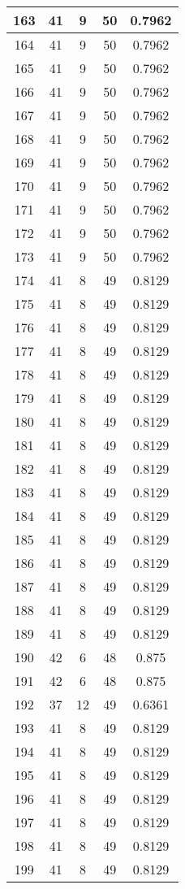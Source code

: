 \documentclass[letterpaper, 12pt]{article}
\begin{document}
\begin{longtable}{|c|c|c|c|c|}
\hline
163 & 41 & 9 & 50 & 0.7962 \\
\hline
164 & 41 & 9 & 50 & 0.7962 \\
\hline
165 & 41 & 9 & 50 & 0.7962 \\
\hline
166 & 41 & 9 & 50 & 0.7962 \\
\hline
167 & 41 & 9 & 50 & 0.7962 \\
\hline
168 & 41 & 9 & 50 & 0.7962 \\
\hline
169 & 41 & 9 & 50 & 0.7962 \\
\hline
170 & 41 & 9 & 50 & 0.7962 \\
\hline
171 & 41 & 9 & 50 & 0.7962 \\
\hline
172 & 41 & 9 & 50 & 0.7962 \\
\hline
173 & 41 & 9 & 50 & 0.7962 \\
\hline
174 & 41 & 8 & 49 & 0.8129 \\
\hline
175 & 41 & 8 & 49 & 0.8129 \\
\hline
176 & 41 & 8 & 49 & 0.8129 \\
\hline
177 & 41 & 8 & 49 & 0.8129 \\
\hline
178 & 41 & 8 & 49 & 0.8129 \\
\hline
179 & 41 & 8 & 49 & 0.8129 \\
\hline
180 & 41 & 8 & 49 & 0.8129 \\
\hline
181 & 41 & 8 & 49 & 0.8129 \\
\hline
182 & 41 & 8 & 49 & 0.8129 \\
\hline
183 & 41 & 8 & 49 & 0.8129 \\
\hline
184 & 41 & 8 & 49 & 0.8129 \\
\hline
185 & 41 & 8 & 49 & 0.8129 \\
\hline
186 & 41 & 8 & 49 & 0.8129 \\
\hline
187 & 41 & 8 & 49 & 0.8129 \\
\hline
188 & 41 & 8 & 49 & 0.8129 \\
\hline
189 & 41 & 8 & 49 & 0.8129 \\
\hline
190 & 42 & 6 & 48 & 0.875 \\
\hline
191 & 42 & 6 & 48 & 0.875 \\
\hline
192 & 37 & 12 & 49 & 0.6361 \\
\hline
193 & 41 & 8 & 49 & 0.8129 \\
\hline
194 & 41 & 8 & 49 & 0.8129 \\
\hline
195 & 41 & 8 & 49 & 0.8129 \\
\hline
196 & 41 & 8 & 49 & 0.8129 \\
\hline
197 & 41 & 8 & 49 & 0.8129 \\
\hline
198 & 41 & 8 & 49 & 0.8129 \\
\hline
199 & 41 & 8 & 49 & 0.8129 \\
\hline
\end{longtable}
\end{document}
